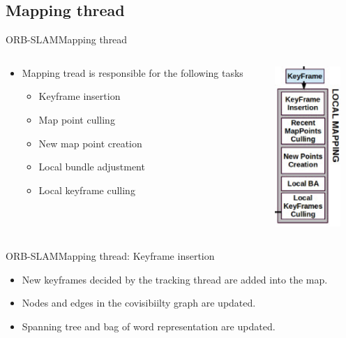 \documentclass{beamer}
\begin{document}
\subsection{Mapping thread}
\begin{frame}{ORB-SLAM}{Mapping thread}
    \begin{columns}[T]
\begin{column}{0.8\textwidth}
\begin{itemize}
\item{
Mapping tread is responsible for the following tasks
\begin{itemize}
    \item{
    Keyframe insertion
    }
    \item{
    Map point culling
    }
    \item{
    New map point creation
    }
    \item{
    Local bundle adjustment
    }
    \item{
    Local keyframe culling
    }
\end{itemize}
} 
\end{itemize}
\end{column}
\begin{column}{0.2\textwidth}
\includegraphics[width=2.5cm]{Figure/localMapping}
\end{column}
\end{columns}
\end{frame}

\begin{frame}{ORB-SLAM}{Mapping thread: Keyframe insertion}
  \begin{itemize}
      \item{
      New keyframes decided by the tracking thread are added into the map.
      }
      \item{
      Nodes and edges in the covisibiilty graph are updated.
      }
      \item{
      Spanning tree and bag of word representation are updated.
      }
  \end{itemize}
\end{frame}
\end{document}
